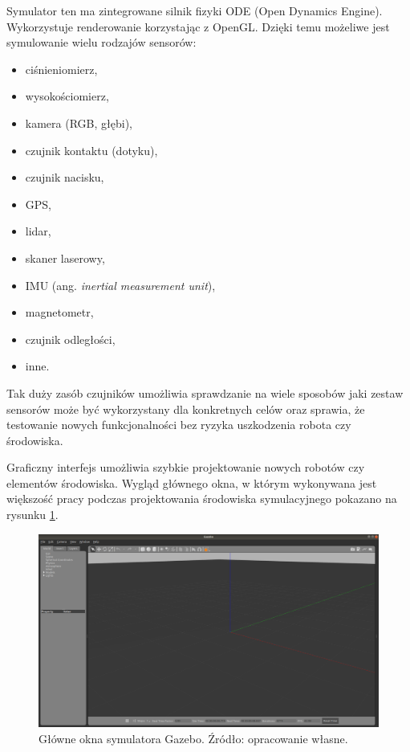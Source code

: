 Symulator ten ma zintegrowane silnik fizyki ODE (Open Dynamics Engine). Wykorzystuje
renderowanie korzystając z OpenGL. Dzięki temu możeliwe jest symulowanie wielu 
rodzajów sensorów:

\begin{itemize}
    \item ciśnieniomierz,
    \item wysokościomierz,
    \item kamera (RGB, głębi),
    \item czujnik kontaktu (dotyku),
    \item czujnik nacisku,
    \item GPS,
    \item lidar,
    \item skaner laserowy,
    \item IMU (ang. \textit{inertial measurement unit}),
    \item magnetometr,
    \item czujnik odległości,
    \item inne.
\end{itemize}

Tak duży zasób czujników umożliwia sprawdzanie na wiele sposobów jaki zestaw 
sensorów może być wykorzystany dla konkretnych celów oraz sprawia, że testowanie
nowych funkcjonalności bez ryzyka uszkodzenia robota czy środowiska. 

Graficzny interfejs umożliwia szybkie projektowanie nowych robotów czy elementów
środowiska. Wygląd głównego okna, w którym wykonywana jest większość pracy
podczas projektowania środowiska symulacyjnego pokazano na rysunku 
\ref{fig:gazebo_main_window}.

\begin{figure}[h]
    \centering
    \includegraphics[width=0.7\linewidth]{rozdzial5/images/gazebo_main_window}
    \caption{Główne okna symulatora Gazebo. Źródło: opracowanie własne.}
    \label{fig:gazebo_main_window}
\end{figure}

